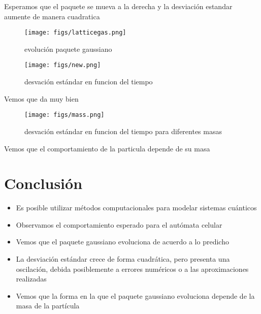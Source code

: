 \documentclass[12pts, letterpaper, twocolumn]{article}
\begin{document}
Esperamos que el paquete se mueva a la derecha y la desviación estandar aumente de manera 
cuadratica

\begin{figure*}[h]
    \centering
    \texttt{[image: figs/latticegas.png]}
    \caption{evolución paquete gaussiano}
    \label{fig:gauss}
\end{figure*}

\begin{figure*}[h]
    \centering
    \texttt{[image: figs/new.png]}
    \caption{desvación estándar en funcion del tiempo}
    \label{fig:sigma}
\end{figure*}

Vemos que da muy bien

\begin{figure*}[h]
    \centering
    \texttt{[image: figs/mass.png]}
    \caption{desvación estándar en funcion del tiempo para diferentes masas}
    \label{fig:mass}
\end{figure*}

Vemos que el comportamiento de la particula depende de su masa

\section{Conclusión}
\begin{itemize}
    \item Es posible utilizar métodos computacionales para modelar sistemas cuánticos
    \item Observamos el comportamiento esperado para el autómata celular
    \item Vemos que el paquete gaussiano evoluciona de acuerdo a lo predicho
    \item La desviación estándar crece de forma cuadrática, pero presenta una oscilación, 
    debida posiblemente a errores numéricos o a las aproximaciones realizadas
    \item Vemos que la forma en la que el paquete gaussiano evoluciona depende de la masa 
    de la partícula
\end{itemize}

\nocite{*}
\printbibliography
\end{document}
